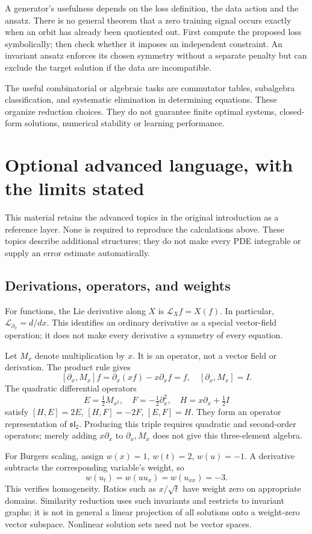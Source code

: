 \documentclass[11pt,a4paper]{article}
\numberwithin{equation}{section}
\theoremstyle{definition}
\theoremstyle{plain}
\theoremstyle{remark}
\begin{document}
A generator's usefulness depends on the loss definition, the data action and the ansatz. There is no general theorem that a zero training signal occurs exactly when an orbit has already been quotiented out. First compute the proposed loss symbolically; then check whether it imposes an independent constraint. An invariant ansatz enforces its chosen symmetry without a separate penalty but can exclude the target solution if the data are incompatible.

The useful combinatorial or algebraic tasks are commutator tables, subalgebra classification, and systematic elimination in determining equations. These organize reduction choices. They do not guarantee finite optimal systems, closed-form solutions, numerical stability or learning performance.

\section{Optional advanced language, with the limits stated}\label{sec:advanced}
This material retains the advanced topics in the original introduction as a reference layer. None is required to reproduce the calculations above. These topics describe additional structures; they do not make every PDE integrable or supply an error estimate automatically.

\subsection{Derivations, operators, and weights}
For functions, the Lie derivative along $X$ is $\mathcal L_Xf=X(f)$. In particular, $\mathcal L_{\partial_x}=d/dx$. This identifies an ordinary derivative as a special vector-field operation; it does not make every derivative a symmetry of every equation.

Let $M_x$ denote multiplication by $x$. It is an operator, not a vector field or derivation. The product rule gives
\[
[\partial_x,M_x]f=\partial_x(xf)-x\partial_xf=f,
\quad[\partial_x,M_x]=I.
\]
The quadratic differential operators
\[
E=\tfrac12M_{x^2},\quad F=-\tfrac12\partial_x^2,\quad
H=x\partial_x+\tfrac12 I
\]
satisfy $[H,E]=2E$, $[H,F]=-2F$, $[E,F]=H$. They form an operator representation of $\mathfrak{sl}_2$. Producing this triple requires quadratic and second-order operators; merely adding $x\partial_x$ to $\partial_x,M_x$ does not give this three-element algebra.

For Burgers scaling, assign $w(x)=1$, $w(t)=2$, $w(u)=-1$. A derivative subtracts the corresponding variable's weight, so
\[
w(u_t)=w(uu_x)=w(u_{xx})=-3.
\]
This verifies homogeneity. Ratios such as $x/\sqrt t$ have weight zero on appropriate domains. Similarity reduction uses such invariants and restricts to invariant graphs; it is not in general a linear projection of all solutions onto a weight-zero vector subspace. Nonlinear solution sets need not be vector spaces.
\end{document}
